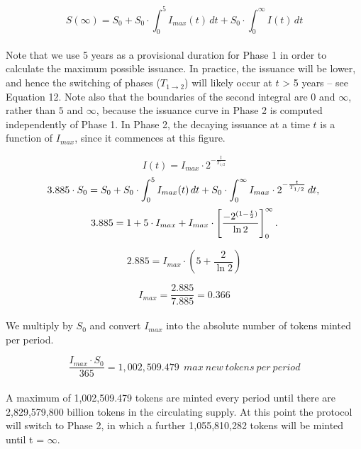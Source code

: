 \documentclass[longbibliography,nofootinbib]{revtex4-1}
\begin{document}
\begin{equation}
    S(\infty) = S_0  +  S_0 \cdot \int_0^{5} I_{max}(t)\, dt  +  S_0 \cdot \int_0^{\infty} I(t)\, dt
\end{equation}
\\
Note that we use 5 years as a provisional duration for Phase 1 in order to calculate the maximum possible issuance. In practice, the issuance will be lower, and hence the switching of phases ($T_{1\rightarrow2}$) will likely occur at $t$ > 5 years – see Equation 12. Note also that the boundaries of the second integral are $0$ and $\infty$, rather than $5$ and $\infty$, because the issuance curve in Phase 2 is computed independently of Phase 1. In Phase 2, the decaying issuance at a time $t$ is a function of $I_{max}$, since it commences at this figure.
 
\begin{equation}
    I(t) = I_{max} \cdot 2^{-\frac{t}{T_{1/2}}}
\end{equation}
\begin{equation}
    3.885 \cdot S_0  = S_0 + S_0 \cdot \int_0^{5} I_{max}(t)\, dt + S_0 \cdot \int_0^{\infty} I_{max} \cdot 2^{-\frac{t}{T_{1/2}}} \, dt ,\\
\end{equation}
\begin{equation}
    3.885 = 1 + 5 \cdot  I_{max} + I_{max} \cdot \left[\frac{-2^{(1-\frac{t}{2})}}{\ln{2}}\right]_0^\infty .\\
\end{equation}

\begin{equation}
    2.885 = I_{max} \cdot (5 + \frac{2}{\ln{2}})
\end{equation}

\begin{equation}
   I_{max} = \frac{2.885}{7.885} = 0.366
\end{equation}
\\
We multiply by $S_0$ and convert $I_{max}$ into the absolute number of tokens minted per period.

\begin{equation}
    \label{eq:abs}
   \frac{I_{max} \cdot S_0}{365} = 1,002,509.479\:\:max\:new \:tokens \:per \:period
\end{equation}
\\
A maximum of 1,002,509.479 tokens are minted every period until there are 2,829,579,800 billion tokens in the circulating supply. At this point the protocol will switch to Phase 2, in which a further 1,055,810,282 tokens will be minted until t = $\infty$.
\end{document}

